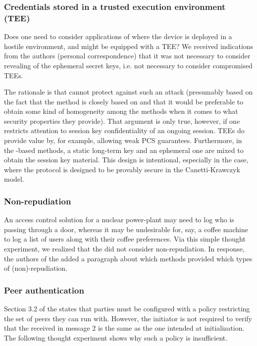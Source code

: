 \documentclass[runningheads, envcountsame, a4paper, draft, x11names]{llncs}
\newcommand{\spacehack}{\vspace{-1em}}
\begin{document}
\spacehack
\subsubsection{Credentials stored in a trusted execution environment (TEE)}
Does one need to consider applications of \mEdhoc{} where the device is
deployed in a hostile environment, and might be equipped with a TEE? We received indications from the \mSpec{} authors (personal correspondence) that it was not necessary to consider revealing of the ephemeral secret keys, i.e. not necessary to consider compromised TEEs. 

The rationale is that \mSigma{} cannot protect against such an attack (presumably based on the fact that the \mSigSig{} method is closely based on \mSigmaI{} and that it would be preferable to obtain some kind of homogeneity among the \mEdhoc{} methods when it comes to what security properties they provide). 
%
That argument is only true, however, if one restricts attention to session key confidentiality of an ongoing session. TEEs do provide value by, for example, allowing weak PCS guarantees. Furthermore, in the \mStat{}-based methods, a static long-term key and an ephemeral one are mixed to obtain the session key material. This design is intentional, especially in the \mOptls{} case, where the protocol is designed to be provably secure in the Canetti-Krawczyk model. 
%
\spacehack
\subsubsection{Non-repudiation}
An access control solution for a nuclear power-plant may need to log who is passing through a door, whereas it may be undesirable for, say, a coffee machine to log a list of users along with their coffee preferences. Via this simple thought experiment, we realized that the \mSpec{} did not
consider non-repudiation. In response, the authors of the \mSpec{} added a paragraph about which methods provided which types of (non)-repudiation.

\spacehack
\subsubsection{Peer authentication}
Section 3.2 of the \mSpec{} states that parties must be configured
with a policy restricting the set of peers they can run \mEdhoc{} with. However, the initiator is not required to verify that the \mIdcredr{} received in message 2 is the same as the one intended at initialization. The following thought experiment shows why such a policy is insufficient.
\end{document}
